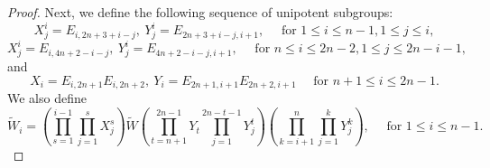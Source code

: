 \documentclass[12pt]{amsart}
\newcommand{\wt}{\widetilde}
\theoremstyle{remark}
\begin{document}
\begin{proof}
Next, we define the following sequence of unipotent subgroups:
\begin{equation*}
	X^i_j=E_{i,2n+3+i-j}, \  Y^i_j=E_{2n+3+i-j,i+1}, \quad \text{ for }  1 \leq i \leq n-1, 1 \leq j \leq i, 
\end{equation*}
\begin{equation*}
X^i_j=E_{i,4n+2-i-j}, \ Y^i_j=E_{4n+2-i-j,i+1}, \quad \text{ for } n \leq i \leq 2n-2, 1 \leq j \leq 2n-i-1, 	
\end{equation*}
and 
\begin{equation*}
X_i = E_{i,2n+1} E_{i,2n+2}, \ Y_i = E_{2n+1,i+1} E_{2n+2,i+1}	\quad \text{ for } n+1 \leq i \leq 2n-1.
\end{equation*}
We also define
\begin{equation*}
	\wt{W}_i = \left( \prod_{s=1}^{i-1} \prod_{j=1}^{s} X^s_j \right)  \wt{W} \left( \prod_{t=n+1}^{2n-1} Y_t \prod_{j=1}^{2n-t-1} Y^t_j \right) \left( \prod_{k=i+1}^{n} \prod_{j=1}^{k} Y^k_j\right), \quad \text{ for } 1\le i \le n-1.
\end{equation*}


\end{proof}
\end{document}

